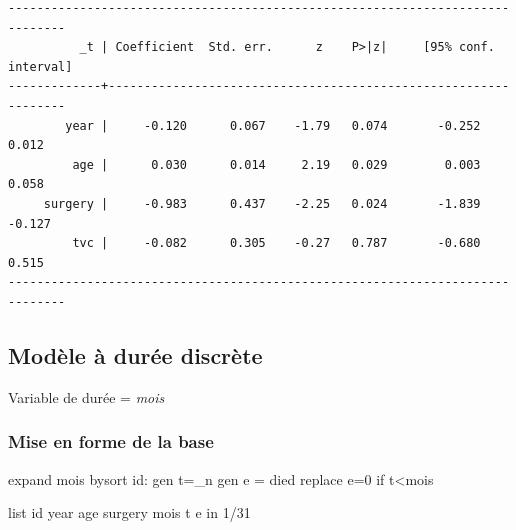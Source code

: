 \documentclass[
  12pt,
  letterpaper,
  DIV=11,
  numbers=noendperiod,
  onepage,
  openany]{scrreprt}
\newenvironment{Shaded}{\begin{snugshade}}{\end{snugshade}}
\newcommand{\DataTypeTok}[1]{\textcolor[rgb]{0.87,0.87,0.75}{#1}}
\newcommand{\FunctionTok}[1]{\textcolor[rgb]{0.94,0.94,0.56}{#1}}
\newcommand{\KeywordTok}[1]{\textcolor[rgb]{0.94,0.87,0.69}{#1}}
\newcommand{\NormalTok}[1]{\textcolor[rgb]{0.80,0.80,0.80}{#1}}
\newcommand{\OtherTok}[1]{\textcolor[rgb]{0.94,0.94,0.56}{#1}}
\begin{document}
\begin{verbatim}
------------------------------------------------------------------------------
          _t | Coefficient  Std. err.      z    P>|z|     [95% conf. interval]
-------------+----------------------------------------------------------------
        year |     -0.120      0.067    -1.79   0.074       -0.252       0.012
         age |      0.030      0.014     2.19   0.029        0.003       0.058
     surgery |     -0.983      0.437    -2.25   0.024       -1.839      -0.127
         tvc |     -0.082      0.305    -0.27   0.787       -0.680       0.515
------------------------------------------------------------------------------
\end{verbatim}

\hypertarget{moduxe8le-uxe0-duruxe9e-discruxe8te-1}{%
\subsection{Modèle à durée
discrète}\label{moduxe8le-uxe0-duruxe9e-discruxe8te-1}}

Variable de durée = \emph{mois}

\hypertarget{mise-en-forme-de-la-base}{%
\subsubsection{Mise en forme de la
base}\label{mise-en-forme-de-la-base}}

\begin{Shaded}
\begin{Highlighting}[]
\NormalTok{expand mois}
\KeywordTok{bysort}\NormalTok{ id: }\KeywordTok{gen}\NormalTok{ t=}\DataTypeTok{\_n}
\KeywordTok{gen} \FunctionTok{e}\NormalTok{ = died}
\KeywordTok{replace} \FunctionTok{e}\NormalTok{=0 }\KeywordTok{if}\NormalTok{ t\textless{}mois}

\OtherTok{list}\NormalTok{ id }\FunctionTok{year}\NormalTok{ age surgery mois t }\FunctionTok{e}  \KeywordTok{in}\NormalTok{ 1/31}
\end{Highlighting}
\end{Shaded}
\end{document}
